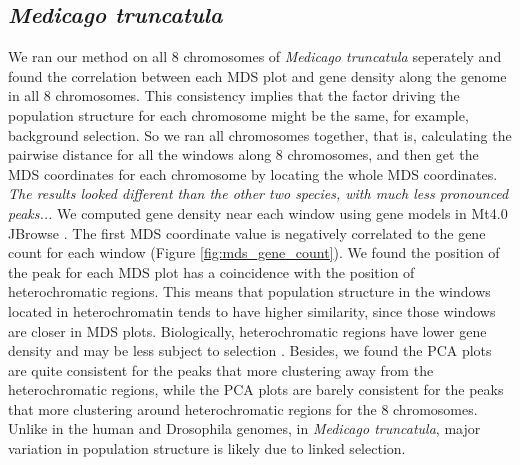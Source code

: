 \documentclass[11pt, oneside]{article}   	%
\newcommand{\plr}[1]{{\em \color{blue} #1}}
\begin{document}
\subsection{\textit{Medicago truncatula}}
We ran our method on all 8 chromosomes of \textit{Medicago truncatula} seperately 
and found the correlation between each MDS plot and gene density along the genome in all 8 chromosomes. 
This consistency implies that the factor driving the population structure for each chromosome might be the same, for example, background selection.
So we ran all chromosomes together, that is, calculating the pairwise distance for all the windows along 8 chromosomes,
and then get the MDS coordinates for each chromosome by locating the whole MDS coordinates.
\plr{The results looked different than the other two species, with much less pronounced peaks...}  
We computed gene density near each window using gene models in Mt4.0 JBrowse \citep{tang2014improved}. 
The first MDS coordinate value is negatively correlated to the gene count for each window (Figure \ref{fig:mds_gene_count}).
We found the position of the peak for each MDS plot has a coincidence with the position of heterochromatic regions. 
This means that population structure in the windows located in heterochromatin tends to have higher similarity, since those windows are closer in MDS plots.
Biologically, heterochromatic regions have lower gene density and may be less subject to selection \citep{kulikova2001integration,paape2013selection}. 
Besides, we found the PCA plots are quite consistent for the peaks that more clustering away from the heterochromatic regions, 
while the PCA plots are barely consistent for the peaks that more clustering around heterochromatic regions for the 8 chromosomes.
Unlike in the human and Drosophila genomes, in \textit{Medicago truncatula}, major variation in population structure is likely due to linked selection. 
\end{document}
